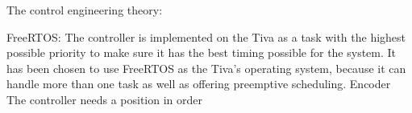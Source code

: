 \documentclass[../../main]{subfiles}
\begin{document}
The control engineering theory:

FreeRTOS:
 The controller is implemented on the Tiva as a task with the highest possible priority to make sure it has the best timing possible for the system. It has been chosen to use FreeRTOS as the Tiva's operating system, because it can handle more than one task as well as offering preemptive scheduling.
Encoder
The controller needs a position in order 
\end{document}
